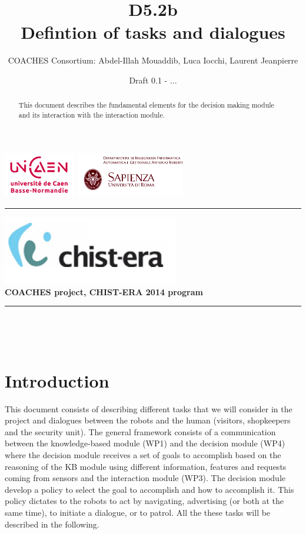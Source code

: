 \documentclass{article}
\title{D5.2b\\ Defintion of tasks and dialogues}
\author{COACHES Consortium: Abdel-Illah Mouaddib, Luca Iocchi, Laurent Jeanpierre}
\date{Draft 0.1 - ...}
\newcommand{\makemadtitle}{
  \hrule
  \vspace{.5em}
  \noindent
  \begin{center}
  \textbf{
  {\centering\includegraphics[height=3cm,bb=0 0 371 145]{../fig/logoCHISTERA2014.png}}\\
   {\centering\Large COACHES project, CHIST-ERA 2014 program}
  }
  \end{center}
  \vspace{.5em}
 
  \hrule
  \vspace{3em}
  \begin{center}
    \begin{Large}\textbf{\usebox{\notetitle}}\end{Large}\\[2em]
    \begin{large}\usebox{\noteauthor}\\ [2em]
    \usebox{\notedate}\end{large}
  \end{center}
  \vspace{3em}
}
\begin{document}
\includegraphics[height=2cm]{../fig/logoUNICAEN.jpg}
\includegraphics[height=2cm]{../fig/logoSapienza.png}



\makemadtitle

\vspace*{1.0in}
\begin{abstract}
 This document describes the fundamental elements for the decision making module and its interaction with the interaction module. 
  \end{abstract}

\vspace*{1.5in}

\newpage
\section{Introduction}
This document consists of describing different tasks that we will consider in the project and dialogues between the robots and the human (visitors, shopkeepers and the security unit).  The general framework consists of a communication between the knowledge-based module (WP1) and the decision module (WP4) where the decision module receives a set of goals to accomplish based on the reasoning of the KB module using different information, features and requests coming from sensors and the interaction module (WP3). The decision module develop a policy to select the goal to accomplish and how to accomplish it. This policy dictates to the robots to act by navigating, advertising (or both at the same time), to initiate a dialogue, or to patrol. All the these tasks will be described in the following. 
\end{document}
